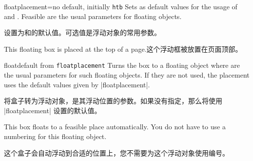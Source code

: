 \begin{docTcbKey}{floatplacement}{=}{no default, initially \texttt{htb}}
Sets  as default values for the usage of 
and .
Feasible are the usual parameters for floating objects.

设置为和的默认值。可选值是浮动对象的常用参数。
\begin{dispListing}

\begin{tcolorbox}[floatplacement=t,%
float,%
title=Floating box from |floatplacement|,%
watermark text={I am floating}]%
This floating box is placed at the top of a page.这个浮动框被放置在页面顶部。
\end{tcolorbox}
\end{dispListing}
\end{docTcbKey}
{\tcbusetemp}


\begin{docTcbKey}{float}{}{default from \texttt{floatplacement}}
Turns the box to a floating object where  are the
usual parameters for such floating objects.
If they are not used, the placement uses the default values given by
|floatplacement|.

将盒子转为浮动对象，是其浮动位置的参数。如果没有指定，那么将使用 |floatplacement| 设置的默认值。
\begin{dispListing}
\begin{tcolorbox}[float, title=Floating box from |float|,
enhanced,watermark text={I'm also floating}]
This box floats to a feasible place automatically. You do not have to
use a numbering for this floating object.

这个盒子会自动浮动到合适的位置上，您不需要为这个浮动对象使用编号。
\end{tcolorbox}
\end{dispListing}
\end{docTcbKey}
{\tcbusetemp}


